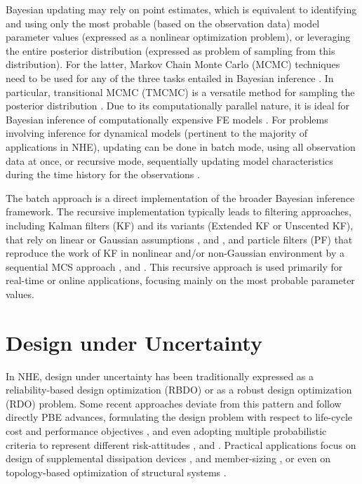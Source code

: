 Bayesian updating may rely on point estimates, which is equivalent to identifying and using only the most probable (based on the observation data) model parameter values (expressed as a nonlinear optimization problem), or leveraging the entire posterior distribution (expressed as problem of sampling from this distribution). For the latter, Markov Chain Monte Carlo (MCMC) techniques need to be used for any of the three tasks entailed in Bayesian inference \citep{catanach2018bayesian}. In particular, transitional MCMC (TMCMC) is a versatile method for sampling the posterior distribution \citep{ching2007transitional,betz2016transitional}. Due to its computationally parallel nature, it is ideal for Bayesian inference of computationally expensive FE models \citep{ramancha2021bayesian, ramancha2021bayesianupdating}. For problems involving inference for dynamical models (pertinent to the majority of applications in NHE), updating can be done in batch mode, using all observation data at once, or recursive mode, sequentially updating model characteristics during the time history for the observations \citep{astroza2017batch,ramancha2021bayesianupdating}.

The batch approach is a direct implementation of the broader Bayesian inference framework. The recursive implementation typically leads to filtering approaches, including Kalman filters (KF) and its variants (Extended KF or Unscented KF), that rely on linear or Gaussian assumptions \citep{astroza2017batch,kontoroupi2017online}, and \citep{erazo2018bayesian}, and particle filters (PF) that reproduce the work of KF in nonlinear and/or non-Gaussian environment by a sequential MCS approach \citep{chatzi2009unscented, wei2013dynamic}, and \citep{olivier2017particle}. This recursive approach is used primarily for real-time or online applications, focusing mainly on the most probable parameter values. 

\section{Design under Uncertainty}
\label{sec:uq_design}

In NHE, design under uncertainty has been traditionally expressed as a reliability-based design optimization (RBDO) \citep{spence2012large, chun2019systemreliabilitybased} or as a robust design optimization (RDO) \citep{greco2015robust} problem. Some recent approaches deviate from this pattern and follow directly PBE advances, formulating the design problem with respect to life-cycle cost and performance objectives \citep{shin2014minimum}, and even adopting multiple probabilistic criteria to represent different risk-attitudes \citep{haukaas2012reliabilitybased, gidaris2017multiobjective, li2018probabilistic}, and \citep{deb2019simplified}. Practical applications focus on design of supplemental dissipation devices \citep{shin2014minimum, gidaris2017multiobjective}, and \citep{altieri2018reliabilitybased} member-sizing \citep{huang2015performancebased, suksuwan2018optimization}, or even on topology-based optimization of structural systems \citep{bobby2017reliabilitybased, zhu2017topology}.

